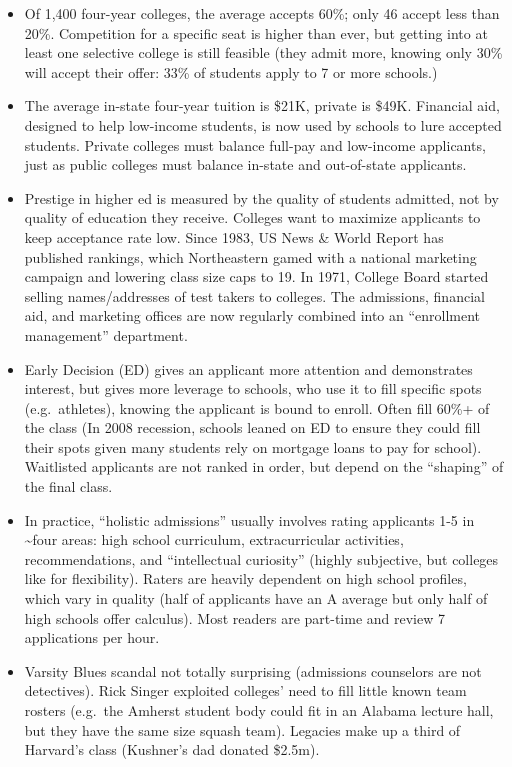 \documentclass[
]{article}
\begin{document}
\begin{itemize}
\item
  Of 1,400 four-year colleges, the average accepts 60\%; only 46 accept
  less than 20\%. Competition for a specific seat is higher than ever,
  but getting into at least one selective college is still feasible
  (they admit more, knowing only 30\% will accept their offer: 33\% of
  students apply to 7 or more schools.)
\item
  The average in-state four-year tuition is \$21K, private is \$49K.
  Financial aid, designed to help low-income students, is now used by
  schools to lure accepted students. Private colleges must balance
  full-pay and low-income applicants, just as public colleges must
  balance in-state and out-of-state applicants.
\item
  Prestige in higher ed is measured by the quality of students admitted,
  not by quality of education they receive. Colleges want to maximize
  applicants to keep acceptance rate low. Since 1983, US News \& World
  Report has published rankings, which Northeastern gamed with a
  national marketing campaign and lowering class size caps to 19. In
  1971, College Board started selling names/addresses of test takers to
  colleges. The admissions, financial aid, and marketing offices are now
  regularly combined into an ``enrollment management'' department.
\item
  Early Decision (ED) gives an applicant more attention and demonstrates
  interest, but gives more leverage to schools, who use it to fill
  specific spots (e.g.~athletes), knowing the applicant is bound to
  enroll. Often fill 60\%+ of the class (In 2008 recession, schools
  leaned on ED to ensure they could fill their spots given many students
  rely on mortgage loans to pay for school). Waitlisted applicants are
  not ranked in order, but depend on the ``shaping'' of the final class.
\item
  In practice, ``holistic admissions'' usually involves rating
  applicants 1-5 in \textasciitilde four areas: high school curriculum,
  extracurricular activities, recommendations, and ``intellectual
  curiosity'' (highly subjective, but colleges like for flexibility).
  Raters are heavily dependent on high school profiles, which vary in
  quality (half of applicants have an A average but only half of high
  schools offer calculus). Most readers are part-time and review 7
  applications per hour.
\item
  Varsity Blues scandal not totally surprising (admissions counselors
  are not detectives). Rick Singer exploited colleges' need to fill
  little known team rosters (e.g.~the Amherst student body could fit in
  an Alabama lecture hall, but they have the same size squash team).
  Legacies make up a third of Harvard's class (Kushner's dad donated
  \$2.5m).
\end{itemize}
\end{document}
